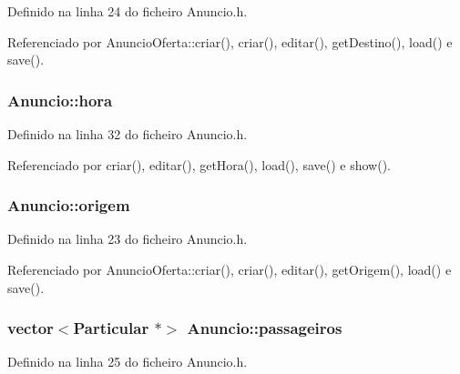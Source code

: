 Definido na linha 24 do ficheiro Anuncio.\+h.



Referenciado por Anuncio\+Oferta\+::criar(), criar(), editar(), get\+Destino(), load() e save().

\hypertarget{class_anuncio_aee851839cb45594b8ee550a032236cfe}{
\subsubsection[{hora}]{ Anuncio\+::hora\hspace{0.3cm}{\ttfamily [protected]}}}\label{class_anuncio_aee851839cb45594b8ee550a032236cfe}


Definido na linha 32 do ficheiro Anuncio.\+h.



Referenciado por criar(), editar(), get\+Hora(), load(), save() e show().

\hypertarget{class_anuncio_a9b3f8ac29ebf2a44e24ea2273064a7f5}{
\subsubsection[{origem}]{ Anuncio\+::origem\hspace{0.3cm}{\ttfamily [protected]}}}\label{class_anuncio_a9b3f8ac29ebf2a44e24ea2273064a7f5}


Definido na linha 23 do ficheiro Anuncio.\+h.



Referenciado por Anuncio\+Oferta\+::criar(), criar(), editar(), get\+Origem(), load() e save().

\hypertarget{class_anuncio_a76cdb1291df7bd8736141304d759ef35}{
\subsubsection[{passageiros}]{\setlength{\rightskip}{0pt plus 5cm}vector$<${\bf Particular} $\ast$$>$ Anuncio\+::passageiros\hspace{0.3cm}{\ttfamily [protected]}}}\label{class_anuncio_a76cdb1291df7bd8736141304d759ef35}


Definido na linha 25 do ficheiro Anuncio.\+h.



